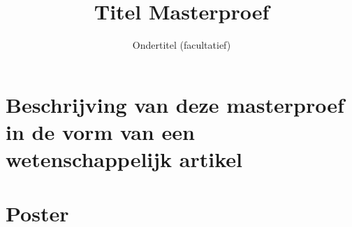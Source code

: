 \documentclass[11pt,a4paper]{report}
\title{Titel Masterproef}
\subtitle{Ondertitel (facultatief)}
\begin{document}
\preface

\printnoidxglossary[type=\acronymtype]%
\clearpage


%
%
%

\printbibliography


\appendix


\chapter{Beschrijving van deze masterproef in de vorm van een wetenschappelijk artikel}
%

\chapter{Poster}
%

%
\end{document}
